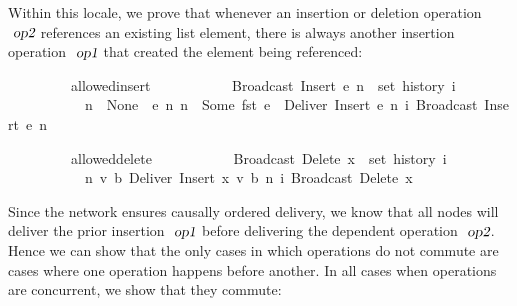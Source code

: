 Within this locale, we prove that whenever an insertion or deletion operation $\isa{op2}$ references an existing list element, there is always another insertion operation $\isa{op1}$ that created the element being referenced:
\vspace{0.35em}
\begin{isabellebody}
\ \ \ \ \ \ \ \ \ allowed{\isacharunderscore}insert{\isacharcolon}\isanewline
\ \ \ \ \ \ \ \ \ \ \ {\isachardoublequoteopen}Broadcast\ {\isacharparenleft}Insert\ e\ n{\isacharparenright}\ {\isasymin}\ set\ {\isacharparenleft}history\ i{\isacharparenright}{\isachardoublequoteclose}\isanewline
\ \ \ \ \ \ \ \ \ \ \ {\isachardoublequoteopen}n\ {\isacharequal}\ None\ {\isasymor}\ {\isacharparenleft}{\isasymexists}e{\isacharprime}\ n{\isacharprime}{\isachardot}\ n\ {\isacharequal}\ Some\ {\isacharparenleft}fst\ e{\isacharprime}{\isacharparenright}\ {\isasymand}\ Deliver\ {\isacharparenleft}Insert\ e{\isacharprime}\ n{\isacharprime}{\isacharparenright}\ {\isasymsqsubset}\isactrlsup i\ Broadcast\ {\isacharparenleft}Insert\ e\ n{\isacharparenright}{\isacharparenright}{\isachardoublequoteclose}
\end{isabellebody}
\vspace{0.35em}
\begin{isabellebody}
\ \ \ \ \ \ \ \ \ allowed{\isacharunderscore}delete{\isacharcolon}\isanewline
\ \ \ \ \ \ \ \ \ \ \ {\isachardoublequoteopen}Broadcast\ {\isacharparenleft}Delete\ x{\isacharparenright}\ {\isasymin}\ set\ {\isacharparenleft}history\ i{\isacharparenright}{\isachardoublequoteclose}\isanewline
\ \ \ \ \ \ \ \ \ \ \ {\isachardoublequoteopen}{\isasymexists}n{\isacharprime}\ v\ b{\isachardot}\ Deliver\ {\isacharparenleft}Insert\ {\isacharparenleft}x{\isacharcomma}\ v{\isacharcomma}\ b{\isacharparenright}\ n{\isacharprime}{\isacharparenright}\ {\isasymsqsubset}\isactrlsup i\ Broadcast\ {\isacharparenleft}Delete\ x{\isacharparenright}{\isachardoublequoteclose}
\end{isabellebody}
\vspace{0.35em}
Since the network ensures causally ordered delivery, we know that all nodes will deliver the prior insertion $\isa{op1}$ before delivering the dependent operation $\isa{op2}$.
Hence we can show that the only cases in which operations do not commute are cases where one operation happens before another.
In all cases when operations are concurrent, we show that they commute:
\vspace{0.35em}
